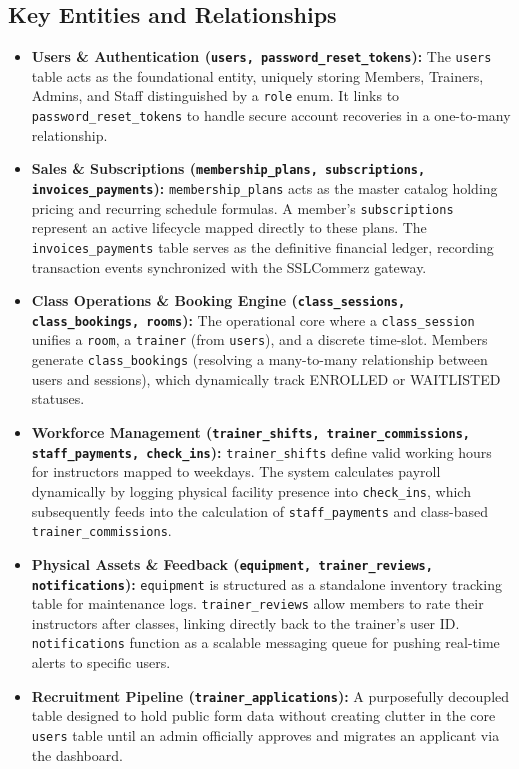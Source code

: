 \documentclass[12pt,a4paper]{article}
\begin{document}
\subsection{Key Entities and Relationships}
\begin{itemize}[leftmargin=*]
    \item \textbf{Users \& Authentication (\texttt{users, password\_reset\_tokens}):} The \texttt{users} table acts as the foundational entity, uniquely storing Members, Trainers, Admins, and Staff distinguished by a \texttt{role} enum. It links to \texttt{password\_reset\_tokens} to handle secure account recoveries in a one-to-many relationship.
    \item \textbf{Sales \& Subscriptions (\texttt{membership\_plans, subscriptions, invoices\_payments}):} \texttt{membership\_plans} acts as the master catalog holding pricing and recurring schedule formulas. A member's \texttt{subscriptions} represent an active lifecycle mapped directly to these plans. The \texttt{invoices\_payments} table serves as the definitive financial ledger, recording transaction events synchronized with the SSLCommerz gateway.
    \item \textbf{Class Operations \& Booking Engine (\texttt{class\_sessions, class\_bookings, rooms}):} The operational core where a \texttt{class\_session} unifies a \texttt{room}, a \texttt{trainer} (from \texttt{users}), and a discrete time-slot. Members generate \texttt{class\_bookings} (resolving a many-to-many relationship between users and sessions), which dynamically track ENROLLED or WAITLISTED statuses.
    \item \textbf{Workforce Management (\texttt{trainer\_shifts, trainer\_commissions, staff\_payments, check\_ins}):} \texttt{trainer\_shifts} define valid working hours for instructors mapped to weekdays. The system calculates payroll dynamically by logging physical facility presence into \texttt{check\_ins}, which subsequently feeds into the calculation of \texttt{staff\_payments} and class-based \texttt{trainer\_commissions}.
    \item \textbf{Physical Assets \& Feedback (\texttt{equipment, trainer\_reviews, notifications}):} \texttt{equipment} is structured as a standalone inventory tracking table for maintenance logs. \texttt{trainer\_reviews} allow members to rate their instructors after classes, linking directly back to the trainer's user ID. \texttt{notifications} function as a scalable messaging queue for pushing real-time alerts to specific users.
    \item \textbf{Recruitment Pipeline (\texttt{trainer\_applications}):} A purposefully decoupled table designed to hold public form data without creating clutter in the core \texttt{users} table until an admin officially approves and migrates an applicant via the dashboard.
\end{itemize}
\end{document}
